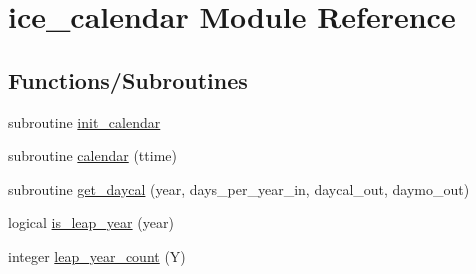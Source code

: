 \hypertarget{namespaceice__calendar}{
\section{ice\_\-calendar Module Reference}
\label{namespaceice__calendar}
}
\subsection*{Functions/Subroutines}
\begin{DoxyCompactItemize}
\item 
subroutine \hyperlink{namespaceice__calendar_a98202ec2aea2b959f54a058cd7d1387c}{init\_\-calendar}
\item 
subroutine \hyperlink{namespaceice__calendar_aa88caa12cfe780c61ddec5bfc825e93c}{calendar} (ttime)
\item 
subroutine \hyperlink{namespaceice__calendar_a69cff580919f3926456034ebbc574dac}{get\_\-daycal} (year, days\_\-per\_\-year\_\-in, daycal\_\-out, daymo\_\-out)
\item 
logical \hyperlink{namespaceice__calendar_a6cc159a7c73375fe57015ddc47dff35e}{is\_\-leap\_\-year} (year)
\item 
integer \hyperlink{namespaceice__calendar_aabc8501f17759aa61f9a704f13571258}{leap\_\-year\_\-count} (Y)
\end{DoxyCompactItemize}
